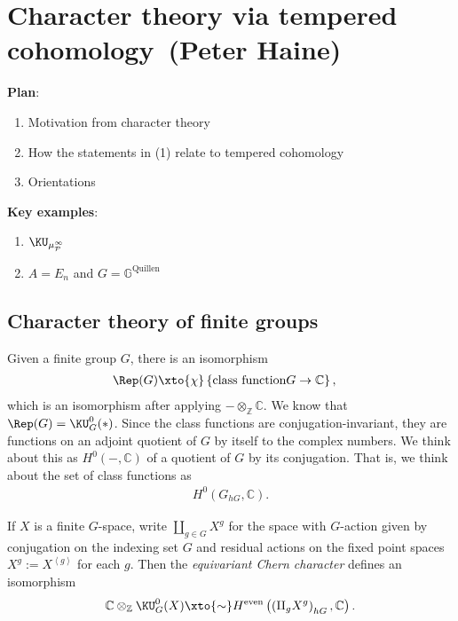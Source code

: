 \renewcommand{\thespeaker}{Peter Haine}
\renewcommand{\thetitle}{Character theory via tempered cohomology}
\section{\thetitle~(\thespeaker)}
\providecommand{\Supp}{\text{Supp}}

\textbf{Plan}:
\begin{enumerate}
    \item Motivation from character theory
    \item How the statements in (1) relate to tempered cohomology
    \item Orientations
\end{enumerate}

\textbf{Key examples}:
\begin{enumerate}
    \item $\KU_{\mu_\mathcal{P}^\infty}$
    \item $A=E_n$ and $G = \mathbb{G}^\text{Quillen}$
\end{enumerate}

\subsection{Character theory of finite groups}

Given a finite group $G$, there is an isomorphism
\begin{align*}
    \Rep(G) &\xto{\chi} \left\{ \text{class function} G \to \mathbb{C} \right\},
\end{align*}
which is an isomorphism after applying $- \otimes_\mathbb{Z} \mathbb{C}$. We know that $\Rep(G) = \KU_G^0(\ast)$. Since the class functions are conjugation-invariant, they are functions on an adjoint quotient of $G$ by itself to the complex numbers. We think about this as $H^0(-, \mathbb{C})$ of a quotient of $G$ by its conjugation. That is, we think about the set of class functions as
\begin{align*}
    H^0 \left( G_{hG}, \mathbb{C} \right).
\end{align*}

\begin{theorem} If $X$ is a finite $G$-space, write $\amalg_{g\in G} X^g$ for the space with $G$-action given by conjugation on the indexing set $G$ and residual actions on the fixed point spaces $X^g := X^{\left\langle g \right\rangle}$ for each $g$. Then the \textit{equivariant Chern character} defines an isomorphism
\begin{align*}
    \mathbb{C} \otimes_\mathbb{Z} \KU_G^0(X) \xto{\sim} H^{\text{even}} \left( \left( \amalg_g X^g \right)_{hG}, \mathbb{C} \right).
\end{align*}
\end{theorem}

